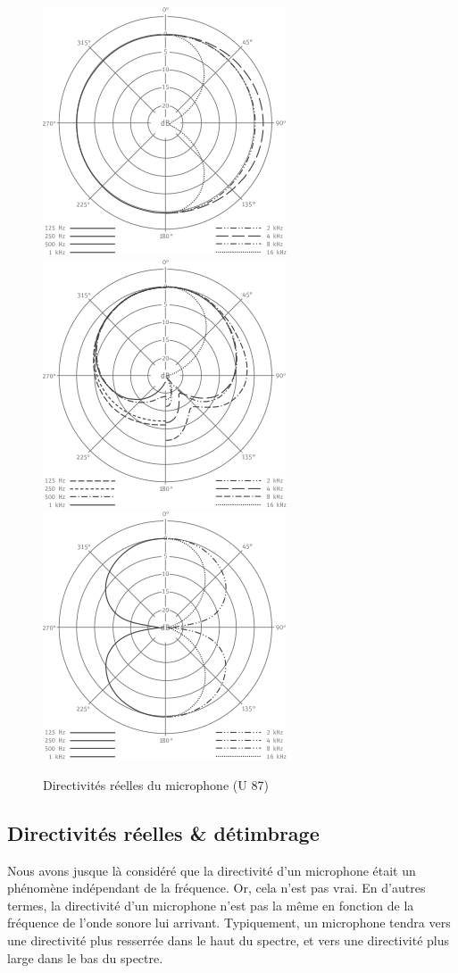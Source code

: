 \documentclass[
]{book}
\begin{document}
\begin{figure}

{\centering \includegraphics[width=0.33\linewidth]{_resources/diagrams/Polar-pattern-U-87-Ai-omni} \includegraphics[width=0.33\linewidth]{_resources/diagrams/Polar-pattern-U-87-Ai-cardioid} \includegraphics[width=0.33\linewidth]{_resources/diagrams/Polar-pattern-U-87-Ai-figure8} 

}

\caption{Directivités réelles du microphone (U 87)}\label{fig:unnamed-chunk-25}
\end{figure}

\hypertarget{directivituxe9s-ruxe9elles-duxe9timbrage}{%
\subsection{Directivités réelles \& détimbrage}\label{directivituxe9s-ruxe9elles-duxe9timbrage}}

Nous avons jusque là considéré que la directivité d'un microphone était un phénomène indépendant de la fréquence. Or, cela n'est pas vrai. En d'autres termes, la directivité d'un microphone n'est pas la même en fonction de la fréquence de l'onde sonore lui arrivant. Typiquement, un microphone tendra vers une directivité plus resserrée dans le haut du spectre, et vers une directivité plus large dans le bas du spectre.
\end{document}
